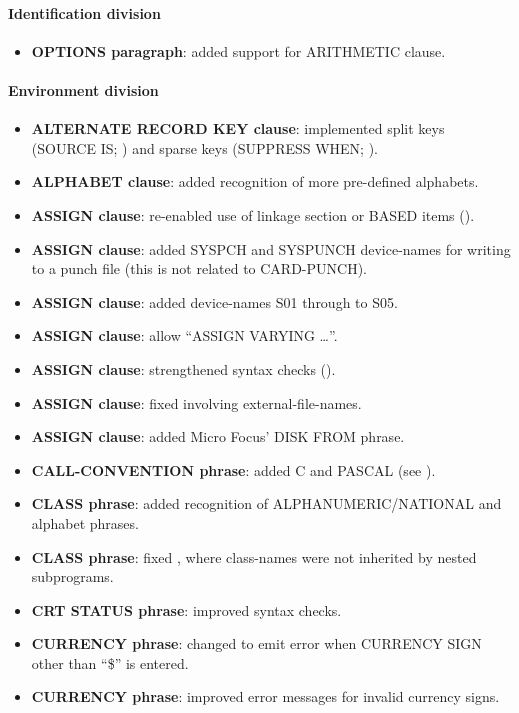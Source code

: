 \paragraph{Identification division}
\begin{itemize}
\item \textbf{OPTIONS paragraph}: added support for ARITHMETIC clause.
\end{itemize}

\paragraph{Environment division}
\begin{itemize}
\item \textbf{ALTERNATE RECORD KEY clause}: implemented split keys (SOURCE IS; ) and sparse keys (SUPPRESS WHEN; ).
\item \textbf{ALPHABET clause}: added recognition of more pre-defined alphabets.
\item \textbf{ASSIGN clause}: re-enabled use of linkage section or BASED items ().
\item \textbf{ASSIGN clause}: added SYSPCH and SYSPUNCH device-names for writing to a punch file (this is not related to CARD-PUNCH).
\item \textbf{ASSIGN clause}: added device-names S01 through to S05.
\item \textbf{ASSIGN clause}: allow ``ASSIGN VARYING \ldots''.
\item \textbf{ASSIGN clause}: strengthened syntax checks ().
\item \textbf{ASSIGN clause}: fixed  involving external-file-names.
\item \textbf{ASSIGN clause}: added Micro Focus' DISK FROM phrase.
\item \textbf{CALL-CONVENTION phrase}: added C and PASCAL (see ).
\item \textbf{CLASS phrase}: added recognition of ALPHANUMERIC\slash{}NATIONAL and alphabet phrases.
\item \textbf{CLASS phrase}: fixed , where class-names were not inherited by nested subprograms.
\item \textbf{CRT STATUS phrase}: improved syntax checks.
\item \textbf{CURRENCY phrase}: changed to emit error when CURRENCY SIGN other than ``\$'' is entered.
\item \textbf{CURRENCY phrase}: improved error messages for invalid currency signs.

\end{itemize}
